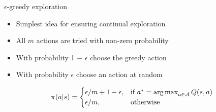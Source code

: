 \bgroup
\begin{frame}{$\epsilon$-greedy exploration}
\begin{itemize}
\item Simplest idea for ensuring continual exploration
\item All $m$ actions are tried with non-zero probability
\item With probability 1 − $\epsilon$ choose the greedy action 
\item With probability $\epsilon$ choose an action at random
\end{itemize}
\begin{equation*}
\pi(a|s) = \begin{cases}
    \epsilon / m + 1 - \epsilon,& \text{if } a^{\ast} = \operatorname*{arg\,max}_{a \in \mathcal{A}} Q(s,a)\\
    \epsilon / m,              & \text{otherwise}
\end{cases}
\end{equation*}
\end{frame}
\egroup